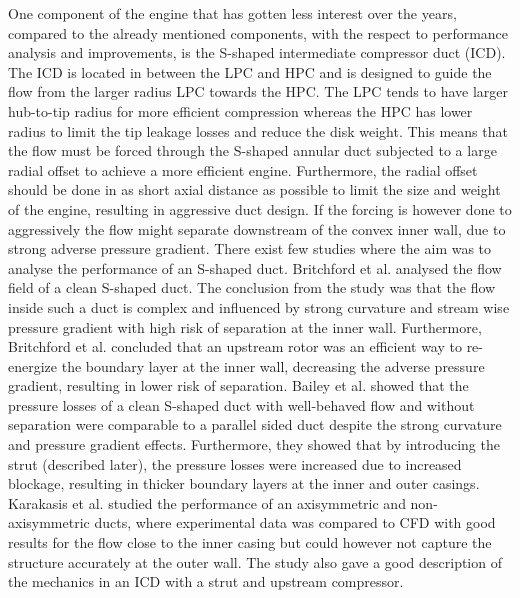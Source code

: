 One component of the engine that has gotten less interest over the years, compared to the already mentioned components, with the respect to performance analysis and improvements, is the S-shaped intermediate compressor duct (ICD). The ICD is located in between the LPC and HPC and is designed to guide the flow from the larger radius LPC towards the HPC. The LPC tends to have larger hub-to-tip radius for more efficient compression whereas the HPC has lower radius to limit the tip leakage losses and reduce the disk weight. This means that the flow must be forced through the S-shaped annular duct subjected to a large radial offset to achieve a more efficient engine. Furthermore, the radial offset should be done in as short axial distance as possible to limit the size and weight of the engine, resulting in aggressive duct design. If the forcing is however done to aggressively the flow might separate downstream of the convex inner wall, due to strong adverse pressure gradient. There exist few studies where the aim was to analyse the performance of an S-shaped duct. Britchford et al. \cite{Britchford1994} analysed the flow field of a clean S-shaped duct. The conclusion from the study was that the flow inside such a duct is complex and influenced by strong curvature and stream wise pressure gradient with high risk of separation at the inner wall. Furthermore, Britchford et al. \cite{Britchford1994b} concluded that an upstream rotor was an efficient way to re-energize the boundary layer at the inner wall, decreasing the adverse pressure gradient, resulting in lower risk of separation. Bailey et al. \cite{Bailey} showed that the pressure losses of a clean S-shaped duct with well-behaved flow and without separation were comparable to a parallel sided duct despite the strong curvature and pressure gradient effects. Furthermore, they showed that by introducing the strut (described later), the pressure losses were increased due to increased blockage, resulting in thicker boundary layers at the inner and outer casings. Karakasis et al. \cite{Karakasis2010} studied the performance of an axisymmetric and non-axisymmetric ducts, where experimental data was compared to CFD with good results for the flow close to the inner casing but could however not capture the structure accurately at the outer wall. The study also gave a good description of the mechanics in an ICD with a strut and upstream compressor.

